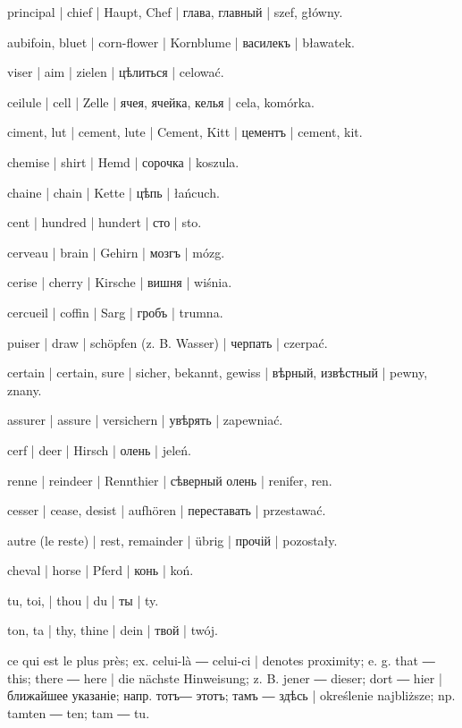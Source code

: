 \begin{outdent}{1em}
principal | chief | Haupt, Chef | глава, главный | szef,
główny.

aubifoin, bluet | corn-flower | Kornblume | василекъ | bławatek.

viser | aim | zielen | цѣлиться | celować.

ceilule | cell | Zelle | ячея, ячейка, келья | cela, komórka.

ciment, lut | cement, lute | Cement, Kitt | цементъ | cement, kit.

chemise | shirt | Hemd | сорочка | koszula.

chaine | chain | Kette | цѣпь | łańcuch.

cent | hundred | hundert | сто | sto.

cerveau | brain | Gehirn | мозгъ | mózg.

cerise | cherry | Kirsche | вишня | wiśnia.

cercueil | coffin | Sarg | гробъ | trumna.

puiser | draw | schöpfen (z. B. Wasser) | черпать | czerpać.

certain | certain, sure | sicher, bekannt, gewiss | вѣрный,
извѣстный | pewny, znany.

\uvsubentry{}
assurer | assure | versichern | увѣрять | zapewniać.

cerf | deer | Hirsch | олень | jeleń.

\uvsubentry{}
renne | reindeer | Rennthier | сѣверный олень | renifer, ren.

cesser | cease, desist | aufhören | переставать | przestawać.

autre (le reste) | rest, remainder | übrig | прочій | pozostały.

cheval | horse | Pferd | конь | koń.

tu, toi, | thou | du | ты | ty.

\uvsubentry{}
ton, ta | thy, thine | dein | твой | twój.

ce qui est le plus près; ex.  celui-là ―  celui-ci | denotes proximity; e. g.  that ―  this;  there
―  here | die nächste Hinweisung; z. B.  jener ―  dieser;  dort ―  hier | ближайшее указаніе;
напр.  тотъ―  этотъ;  тамъ ―  здѣсь | określenie najbliższe; np.  tamten ―  ten;  tam
―  tu.


\end{outdent}

